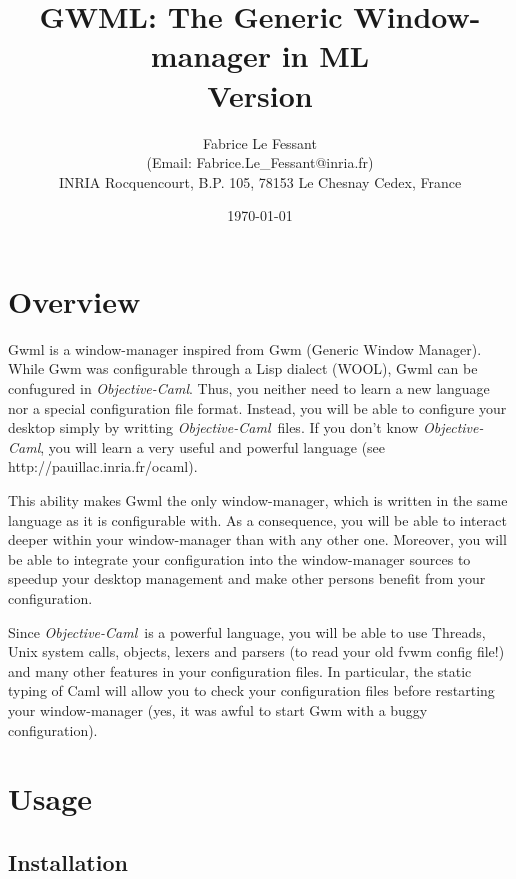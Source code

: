\documentclass{book}
\title{GWML: The Generic Window-manager in ML\\Version \version}
\author{Fabrice Le Fessant\\
    (Email: Fabrice.Le\_Fessant@inria.fr)\\
    INRIA Rocquencourt, B.P. 105, 78153 Le Chesnay Cedex, France }
\date{\today}
\newcommand{\ocaml}{\emph{Objective-Caml}}
\begin{document}
\maketitle
\tableofcontents

\chapter{Overview}

  Gwml is a window-manager inspired from Gwm (Generic Window Manager). While
Gwm was configurable through a Lisp dialect (WOOL), Gwml can be confugured
in \ocaml. Thus, you neither need to learn a new language nor a
special configuration file format. Instead, you will be able to
configure your desktop simply by writting \ocaml~files. If you 
don't know \ocaml, you will learn a very useful and powerful language
(see http://pauillac.inria.fr/ocaml).

 This ability makes Gwml the only window-manager, which is written in the
same language as it is configurable with. As a consequence, you will be
able to interact deeper within your window-manager than with any other one.
Moreover, you will be able to integrate your configuration into the
window-manager sources to speedup your desktop management and make other
persons benefit from your configuration.

 Since \ocaml~is a powerful language, you will be able to use Threads, Unix
system calls, objects, lexers and parsers (to read your old fvwm config file!)
and many other features in your configuration files. In particular, the 
static typing of Caml will allow you to check your configuration files before
restarting your window-manager (yes, it was awful to start Gwm with a 
buggy configuration).

\chapter{Usage}

\section{Installation}
\end{document}
